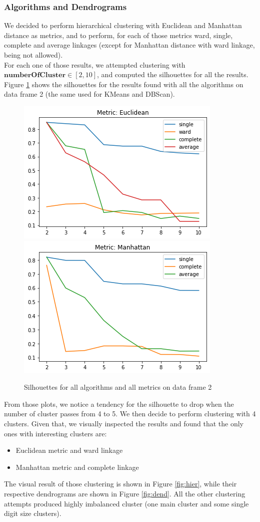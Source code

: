 \documentclass{article}
\begin{document}
	\subsubsection{Algorithms and Dendrograms}
	\label{sec:hier}
	We decided to perform hierarchical clustering with Euclidean and Manhattan distance as metrics, and to perform, for each of those metrics ward, single, complete and average linkages (except for Manhattan distance with ward linkage, being not allowed).\\
	For each one of those results, we attempted clustering with $\mathbf{numberOfCluster} \in [2, 10]$, and computed the silhouettes for all the results.
	Figure \ref{fig:silu} shows the silhouettes for the results found with all the algorithms on data frame 2 (the same used for KMeans and DBScan).
	\begin{figure}[]
		\centering
		\includegraphics[width=.35\textwidth]{silueuc}\hspace{1cm}
		\includegraphics[width=.35\textwidth]{siluman.png}
		\caption{Silhouettes for all algorithms and all metrics on data frame 2}
		\label{fig:silu}
	\end{figure}
	From those plots, we notice a tendency for the silhouette to drop when the number of cluster passes from 4 to 5. We then decide to perform clustering with 4 clusters.
	Given that, we visually inspected the results and found that the only ones with interesting clusters are:
	\begin{itemize}
		\item Euclidean metric and ward linkage
		\item Manhattan metric and complete linkage
	\end{itemize}
	The visual result of those clustering is shown in Figure \ref{fig:hier}, while their respective dendrograms are shown in Figure \ref{fig:dend}. All the other clustering attempts produced highly imbalanced cluster (one main cluster and some single digit size clusters).
\end{document}
